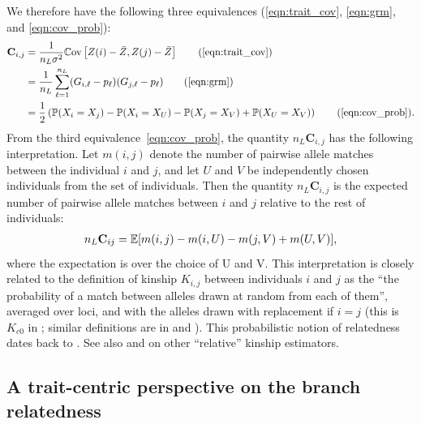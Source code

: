 We therefore have the following three equivalences
(\ref{eqn:trait_cov}, \ref{eqn:grm}, and \ref{eqn:cov_prob}):
%
\begin{align} \label{eqn:equivalence}
    \mathbf{C}_{i,j} &= \frac{1}{n_L \sigma^2}\Cov\left[Z(i) - \bar{Z}, Z(j) - \bar{Z}\right] \tag{\ref{eqn:trait_cov}} \\
                     &= \frac{1}{n_L}\sum_{\ell=1}^{n_L} (G_{i,\ell} - p_\ell)(G_{j,\ell} - p_\ell) \tag{\ref{eqn:grm}} \\
                     &= \frac{1}{2}\left(\P(X_i = X_j) - \P(X_i = X_U) - \P(X_j = X_V) + \P(X_U = X_V) \right) \tag{\ref{eqn:cov_prob}}.
\end{align}
%
From the third equivalence~\eqref{eqn:cov_prob},
the quantity $n_L\mathbf{C}_{i,j}$ has the following interpretation.
%
Let $m(i,j)$ denote the number of pairwise allele matches between
the individual $i$ and $j$,
and let $U$ and $V$ be independently chosen individuals from the set of individuals.
%
Then the quantity $n_L\mathbf{C}_{i,j}$
is the expected number of pairwise allele matches between $i$ and $j$
relative to the rest of individuals:
%
\begin{align} \label{eqn:relative_allele_matches}
    n_L \mathbf{C}_{ij} = \mathbb{E}[m(i,j) - m(i,U) - m(j,V) + m(U,V)],
\end{align}
%
where the expectation is over the choice of U and V.
%
This interpretation is closely related to the definition of kinship $K_{i,j}$
between individuals $i$ and $j$ as the
``the probability of a match between alleles drawn at random from each of them'',
averaged over loci, and with the alleles drawn with replacement if $i=j$
(this is $K_{c0}$ in \citet{speed2015relatedness};
similar definitions are in \citet{vanraden2008efficient} and \citet{yang2010common}).
%
This probabilistic notion of relatedness dates back to \citet{malecot1969mathemathics}.
%
See also \citet{weir2017unified, weir2018how} and \citet{ochoa2021estimating} on
other ``relative'' kinship estimators.


\subsection{A trait-centric perspective on the branch relatedness} \label{sec:trait-centric}

